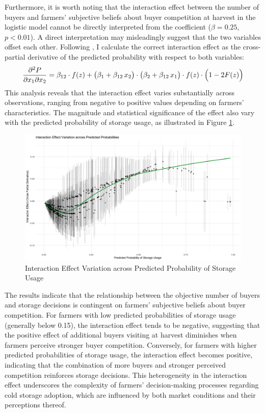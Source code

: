 \documentclass[12pt]{article}
\begin{document}
Furthermore, it is worth noting that the interaction effect between the number of buyers and farmers' subjective beliefs about buyer competition at harvest in the logistic model cannot be directly interpreted from the coefficient ($\beta = 0.25$, $p < 0.01$). A direct interpretation may misleadingly suggest that the two variables offset each other. Following \cite{ai2003interaction}, I calculate the correct interaction effect as the cross-partial derivative of the predicted probability with respect to both variables: $$\frac{\partial^2 P}{\partial x_1 \partial x_2} = \beta_{12} \cdot f(z) + \bigl(\beta_1 + \beta_{12} \, x_2\bigr) \cdot \bigl(\beta_2 + \beta_{12} \, x_1\bigr) \cdot f(z) \cdot \Bigl(1 - 2F(z)\Bigr)$$ This analysis reveals that the interaction effect varies substantially across observations, ranging from negative to positive values depending on farmers' characteristics. The magnitude and statistical significance of the effect also vary with the predicted probability of storage usage, as illustrated in Figure \ref{Figure: interaction effects}.

\begin{figure}[ht]
\centering
\includegraphics[width=1\textwidth]{figures/Interaction_Effect_across_Predicted Probabilities.png}
\caption{Interaction Effect Variation across Predicted Probability of Storage Usage}
\label{Figure: interaction effects}
\end{figure}

The results indicate that the relationship between the objective number of buyers and storage decisions is contingent on farmers' subjective beliefs about buyer competition. For farmers with low predicted probabilities of storage usage (generally below 0.15), the interaction effect tends to be negative, suggesting that the positive effect of additional buyers visiting at harvest diminishes when farmers perceive stronger buyer competition. Conversely, for farmers with higher predicted probabilities of storage usage, the interaction effect becomes positive, indicating that the combination of more buyers and stronger perceived competition reinforces storage decisions. This heterogeneity in the interaction effect underscores the complexity of farmers' decision-making processes regarding cold storage adoption, which are influenced by both market conditions and their perceptions thereof.
\end{document}
